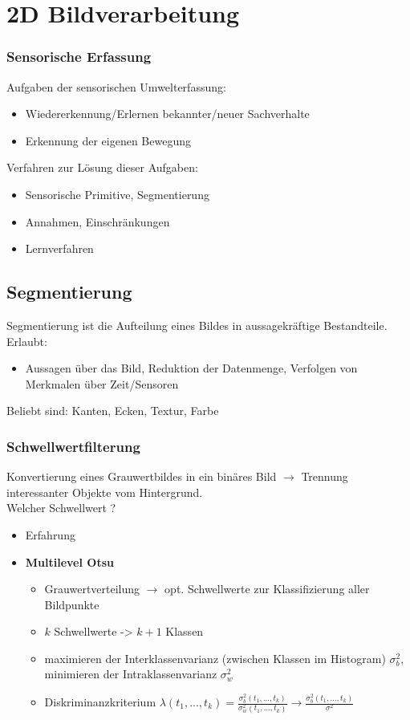 \section{2D Bildverarbeitung}

\subsubsection*{Sensorische Erfassung}

Aufgaben der sensorischen Umwelterfassung:
\begin{itemize}
\item Wiedererkennung/Erlernen bekannter/neuer Sachverhalte
\item Erkennung der eigenen Bewegung
\end{itemize}
Verfahren zur Lösung dieser Aufgaben:
\begin{itemize}
\item Sensorische Primitive, Segmentierung
\item Annahmen, Einschränkungen
\item Lernverfahren
\end{itemize}

\subsection{Segmentierung}

Segmentierung ist die Aufteilung eines Bildes in aussagekräftige Bestandteile. Erlaubt:
\begin{itemize}
\item Aussagen über das Bild, Reduktion der Datenmenge, Verfolgen von Merkmalen über Zeit/Sensoren
\end{itemize}
Beliebt sind: Kanten, Ecken, Textur, Farbe

\subsubsection{Schwellwertfilterung}

Konvertierung eines Grauwertbildes in ein binäres Bild $\to$ Trennung interessanter Objekte vom Hintergrund. \\
Welcher Schwellwert ?
\begin{itemize}
	\item Erfahrung
	\item \textbf{Multilevel Otsu}
	\begin{itemize}
		\item Grauwertverteilung $\to$ opt. Schwellwerte zur Klassifizierung aller Bildpunkte
		\item $k$ Schwellwerte -> $k+1$ Klassen
		\item maximieren der Interklassenvarianz (zwischen Klassen im Histogram) $\sigma_b^2$, minimieren der Intraklassenvarianz $\sigma_w^2$
		\item Diskriminanzkriterium $\lambda(t_1, ..., t_k) = \frac{\sigma_b^2(t_1, ..., t_k)}{\sigma_w^2(t_1, ..., t_k)} \to \frac{\sigma_b^2(t_1, ..., t_k)}{\sigma^2}$
	\end{itemize}
\end{itemize}

